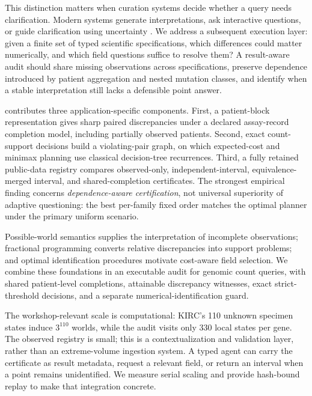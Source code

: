 This distinction matters when curation systems decide whether a query needs clarification. Modern systems generate interpretations, ask interactive questions, or guide clarification using uncertainty \cite{nalir,ambiqt,saparina,intentsim,sage}. We address a subsequent execution layer: given a finite set of typed scientific specifications, which differences could matter numerically, and which field questions suffice to resolve them? A result-aware audit should share missing observations across specifications, preserve dependence introduced by patient aggregation and nested mutation classes, and identify when a stable interpretation still lacks a defensible point answer.

\CLARA{} contributes three application-specific components. First, a patient-block representation gives sharp paired discrepancies under a declared assay-record completion model, including partially observed patients. Second, exact count-support decisions build a violating-pair graph, on which expected-cost and minimax planning use classical decision-tree recurrences. Third, a fully retained public-data registry compares observed-only, independent-interval, equivalence-merged interval, and shared-completion certificates. The strongest empirical finding concerns \emph{dependence-aware certification}, not universal superiority of adaptive questioning: the best per-family fixed order matches the optimal planner under the primary uniform scenario.

Possible-world semantics \cite{incomplete} supplies the interpretation of incomplete observations; fractional programming \cite{dinkelbach} converts relative discrepancies into support problems; and optimal identification procedures \cite{garey} motivate cost-aware field selection. We combine these foundations in an executable audit for genomic count queries, with shared patient-level completions, attainable discrepancy witnesses, exact strict-threshold decisions, and a separate numerical-identification guard.

The workshop-relevant scale is computational: KIRC's 110 unknown specimen states induce $3^{110}$ worlds, while the audit visits only 330 local states per gene. The observed registry is small; this is a contextualization and validation layer, rather than an extreme-volume ingestion system. A typed agent can carry the certificate as result metadata, request a relevant field, or return an interval when a point remains unidentified. We measure serial scaling and provide hash-bound replay to make that integration concrete.

